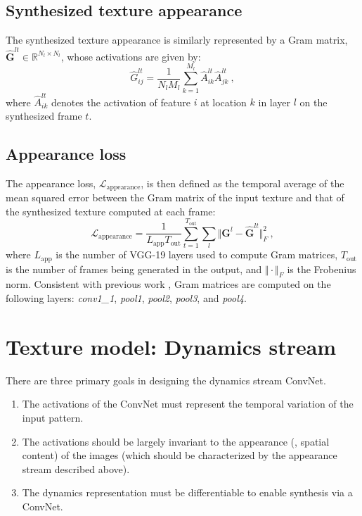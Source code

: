 \subsection{Synthesized texture appearance}

The synthesized texture appearance is similarly represented by a
Gram matrix, $\hat{\mathbf{G}}^{lt} \in \mathbb{R}^{N_l \times N_l}$,
whose activations are given by:
\begin{equation}
	\hat{G}_{ij}^{lt} = \frac{1}{N_l M_l} \sum_{k=1}^{M_l} \hat{A}_{ik}^{lt} \hat{A}_{jk}^{lt}\ ,
	\label{eq:gram_synthesized}	
\end{equation}
where $\hat{A}_{ik}^{lt}$ denotes the activation of feature $i$ at
location $k$ in layer $l$ on the synthesized frame $t$.

\subsection{Appearance loss}

The appearance loss, $\mathcal{L}_\text{appearance}$, is then 
defined as the temporal average of the mean squared error between
the Gram matrix of the input texture and that of the synthesized
texture computed at each frame:
\begin{equation}
   \mathcal{L}_\text{appearance} = \frac{1}{L_\text{app} T_\text{out}} \sum_{t=1}^{T_\text{out}} \sum_{l} \Vert \mathbf{G}^l - \hat{\mathbf{G}}^{lt} \Vert^2_F\ ,
   \label{eq:apploss}
\end{equation}
where $L_\text{app}$ is the number of VGG-19 layers used to compute Gram
matrices, $T_\text{out}$ is the number of frames being generated in
the output, and $\Vert \cdot \Vert_F$ is the Frobenius norm.
Consistent with previous work \cite{gatys2015}, Gram matrices are computed on the
following layers: 
\emph{conv1\_1}, \emph{pool1}, \emph{pool2}, \emph{pool3}, and \emph{pool4}.

\section{Texture model: Dynamics stream}

There are three primary goals in designing the dynamics stream ConvNet.
\begin{enumerate}
	\item The activations of the ConvNet must represent the temporal variation of the input pattern.
	\item The activations should be largely invariant to the appearance (\ie, spatial content) of the images (which should be characterized by the appearance stream described above).
	\item The dynamics representation must be differentiable to enable synthesis via a ConvNet.
\end{enumerate}

